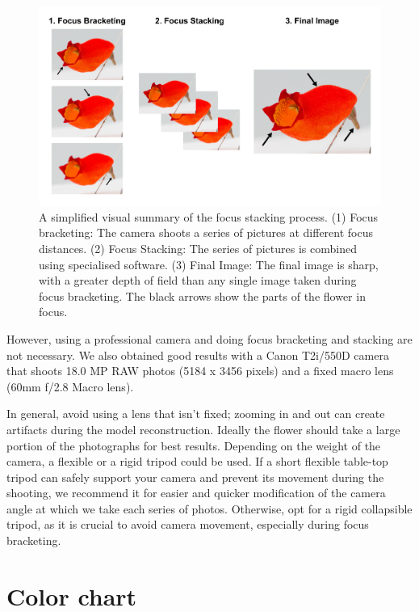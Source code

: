 \documentclass[
]{book}
\begin{document}
\begin{figure}

{\centering \includegraphics[width=1\linewidth]{Figures/Focus_Stacking_Graphic} 

}

\caption{A simplified visual summary of the focus stacking process. (1) Focus bracketing: The camera shoots a series of pictures at different focus distances. (2) Focus Stacking: The series of pictures is combined using specialised software. (3) Final Image: The final image is sharp, with a greater depth of field than any single image taken during focus bracketing. The black arrows show the parts of the flower in focus.}\label{fig:Focus-Stacking-Graphic}
\end{figure}

However, using a professional camera and doing focus bracketing and stacking are not necessary. We also
obtained good results with a Canon T2i/550D camera that shoots 18.0 MP
RAW photos (5184 x 3456 pixels) and a fixed macro lens (60mm f/2.8 Macro lens).

In general, avoid using a lens that isn't fixed; zooming
in and out can create artifacts during the model reconstruction. Ideally
the flower should take a large portion of the photographs for best
results. Depending on the weight of the camera, a flexible or a rigid tripod could be used. If a short flexible table-top tripod can safely support your camera and prevent its movement during the shooting, we recommend it for easier and quicker modification of the camera angle at which we take each series of photos. Otherwise, opt for a rigid collapsible tripod, as it is crucial to avoid camera movement, especially during focus bracketing.

\hypertarget{color-chart}{%
\section{Color chart}\label{color-chart}}
\end{document}
